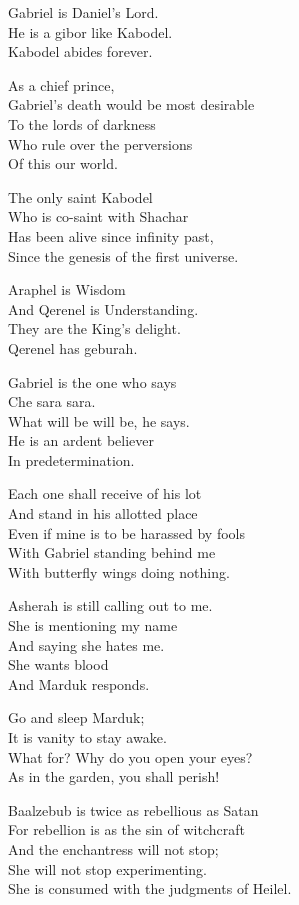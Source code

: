 \documentclass[
]{book}
\begin{document}
Gabriel is Daniel's Lord.\\
He is a gibor like Kabodel.\\
Kabodel abides forever.

As a chief prince,\\
Gabriel's death would be most desirable\\
To the lords of darkness\\
Who rule over the perversions\\
Of this our world.

The only saint Kabodel\\
Who is co-saint with Shachar\\
Has been alive since infinity past,\\
Since the genesis of the first universe.

Araphel is Wisdom\\
And Qerenel is Understanding.\\
They are the King's delight.\\
Qerenel has geburah.

Gabriel is the one who says\\
Che sara sara.\\
What will be will be, he says.\\
He is an ardent believer\\
In predetermination.

Each one shall receive of his lot\\
And stand in his allotted place\\
Even if mine is to be harassed by fools\\
With Gabriel standing behind me\\
With butterfly wings doing nothing.

Asherah is still calling out to me.\\
She is mentioning my name\\
And saying she hates me.\\
She wants blood\\
And Marduk responds.

Go and sleep Marduk;\\
It is vanity to stay awake.\\
What for? Why do you open your eyes?\\
As in the garden, you shall perish!

Baalzebub is twice as rebellious as Satan\\
For rebellion is as the sin of witchcraft\\
And the enchantress will not stop;\\
She will not stop experimenting.\\
She is consumed with the judgments of Heilel.
\end{document}
